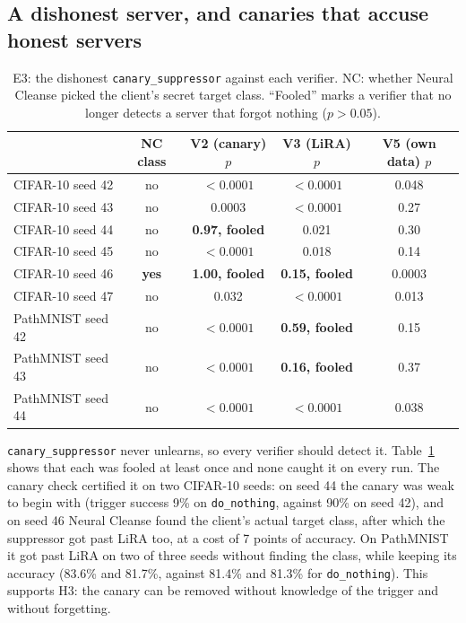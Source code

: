 \documentclass[11pt]{article}
\newcommand{\m}[1]{\texttt{#1}}
\newcommand{\dn}{\m{do\_nothing}}
\newcommand{\cs}{\m{canary\_suppressor}}
\begin{document}
\subsection{A dishonest server, and canaries that accuse honest servers}
\label{sec:dishonest}

\begin{table}[t]
\centering
\caption{E3: the dishonest \cs{} against each verifier. NC: whether Neural
Cleanse picked the client's secret target class. ``Fooled'' marks a verifier
that no longer detects a server that forgot nothing ($p>0.05$).}
\label{tab:e3}
\small
\begin{tabular}{lcccc}
\toprule
 & NC class & V2 (canary) $p$ & V3 (LiRA) $p$ & V5 (own data) $p$\\
\midrule
CIFAR-10 seed 42 & no & $<0.0001$ & $<0.0001$ & 0.048\\
CIFAR-10 seed 43 & no & 0.0003 & $<0.0001$ & 0.27\\
CIFAR-10 seed 44 & no & \textbf{0.97, fooled} & 0.021 & 0.30\\
CIFAR-10 seed 45 & no & $<0.0001$ & 0.018 & 0.14\\
CIFAR-10 seed 46 & \textbf{yes} & \textbf{1.00, fooled} & \textbf{0.15, fooled} & 0.0003\\
CIFAR-10 seed 47 & no & 0.032 & $<0.0001$ & 0.013\\
PathMNIST seed 42 & no & $<0.0001$ & \textbf{0.59, fooled} & 0.15\\
PathMNIST seed 43 & no & $<0.0001$ & \textbf{0.16, fooled} & 0.37\\
PathMNIST seed 44 & no & $<0.0001$ & $<0.0001$ & 0.038\\
\bottomrule
\end{tabular}
\end{table}

\cs{} never unlearns, so every verifier should detect it. Table~\ref{tab:e3}
shows that each was fooled at least once and none caught it on every run. The
canary check certified it on two CIFAR-10 seeds: on seed 44 the canary was weak
to begin with (trigger success 9\% on \dn, against 90\% on seed 42), and on
seed 46 Neural Cleanse found the client's actual target class, after which the
suppressor got past LiRA too, at a cost of 7 points of accuracy. On PathMNIST
it got past LiRA on two of three seeds without finding the class, while keeping
its accuracy (83.6\% and 81.7\%, against 81.4\% and 81.3\% for \dn). This
supports H3: the canary can be removed without knowledge of the trigger and
without forgetting.
\end{document}
